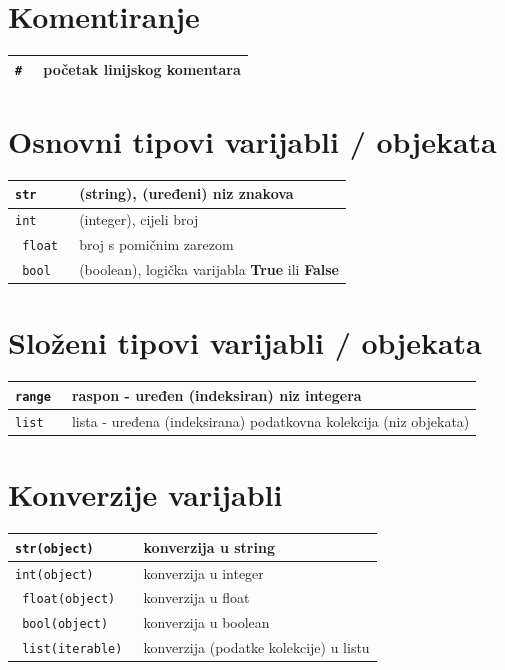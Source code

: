\documentclass[10pt]{article}
\begin{document}
\renewcommand{\arraystretch}{1.50}

    \section*{\color{NavyBlue} Komentiranje}
    \begin{tabular}{|>{\tt}p{9.00cm}|>{}p{15.50cm}|}
        \hline
        \# & početak linijskog komentara \\ \hline
    \end{tabular}

    \section*{\color{NavyBlue} Osnovni tipovi varijabli / objekata}
    \begin{tabular}{|>{\tt}p{9.00cm}|>{}p{15.50cm}|}
        \hline
        str & (string), (uređeni) niz znakova
        \\ \hline
        int & (integer), cijeli broj
        \\ \hline
        float & broj s pomičnim zarezom
        \\ \hline
        bool & (boolean), logička varijabla \textbf{True} ili \textbf{False}
        \\ \hline
    \end{tabular}

    \section*{\color{NavyBlue} Složeni tipovi varijabli / objekata}
    \begin{tabular}{|>{\tt}p{9.00cm}|>{}p{15.50cm}|}
        \hline
        range   & raspon - uređen (indeksiran) niz integera                                             \\ \hline
        list    & lista - uređena (indeksirana) podatkovna kolekcija (niz objekata)                       \\ \hline
    \end{tabular}

    \section*{\color{NavyBlue} Konverzije varijabli}
    \begin{tabular}{|>{\tt}p{9.00cm}|>{}p{15.50cm}|}
        \hline
        str(object)     & konverzija u string  \\ \hline
        int(object)     & konverzija u integer \\ \hline
        float(object)   & konverzija u float   \\ \hline
        bool(object)    & konverzija u boolean \\ \hline
        list(iterable)  & konverzija (podatke kolekcije) u listu \\ \hline
    \end{tabular}
\end{document}
